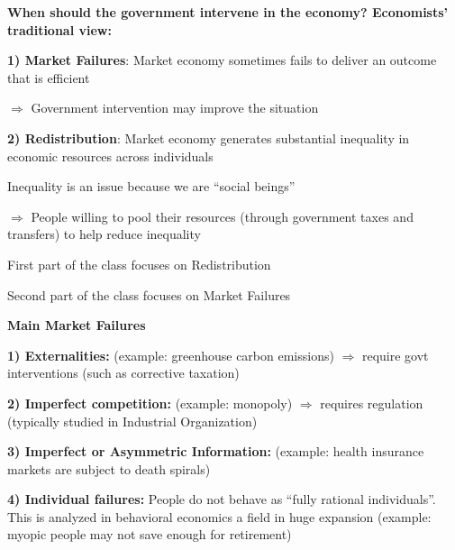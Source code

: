 \documentclass[landscape]{slides}
\begin{document}
\begin{slide}
\begin{center}
{\bf When should the government intervene in the economy? Economists' traditional view: }
\end{center}

{\bf 1) Market Failures}: Market economy sometimes fails to deliver an outcome that is efficient

$\Rightarrow$ Government intervention may improve the situation


{\bf 2) Redistribution}: Market economy generates substantial inequality in economic resources
across individuals 

Inequality is an issue because we are ``social beings''

$\Rightarrow$ People willing to pool their resources (through government taxes and transfers) 
to help reduce inequality 

First part of the class focuses on Redistribution

Second part of the class focuses on Market Failures

\end{slide}

\begin{slide}
\begin{center}
{\bf Main Market Failures}
\end{center}

\textbf{1) Externalities:} (example: greenhouse carbon emissions) $\Rightarrow$ require
govt interventions (such as corrective taxation)

\textbf{2) Imperfect competition:} (example: monopoly) $\Rightarrow$  requires
regulation (typically studied in Industrial Organization)

\textbf{3) Imperfect or Asymmetric Information:} (example: health insurance
markets are subject to death spirals)

\textbf{4) Individual failures:} People do not behave as ``fully rational individuals''. This is analyzed
in behavioral economics a field in huge expansion (example:
myopic people may not save enough for retirement)

\end{slide}


%
\end{document}
